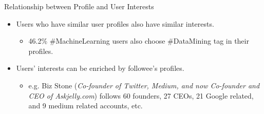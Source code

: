\documentclass{beamer}
\begin{document}
\begin{frame}
\begin{columns}[T]
\begin{column}{.46\textwidth}
{\begin{block}{Relationship between Profile and User Interests }
\begin{itemize}
\item Users who have similar user profiles also have similar interests.
        \begin{itemize}
                \item 46.2\% \#MachineLearning users also choose \#DataMining tag in their profiles.
        \end{itemize}
\item Users' interests can be enriched by followee's profiles.
        \begin{itemize}
                \item e.g. Biz Stone (\textit{Co-founder of Twitter, Medium, and now Co-founder and CEO of Askjelly.com}) follows 60 founders, 27 CEOs, 21 Google related, and 9 medium related accounts, etc. 
        \end{itemize}
\end{itemize}


\end{block}

}
\end{column}
\end{columns}
\end{frame}
\end{document}
